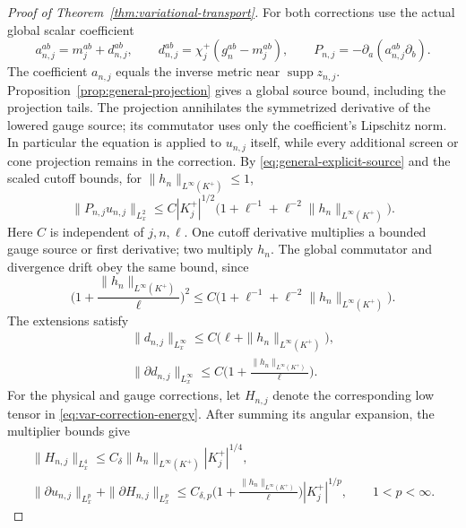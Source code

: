 \documentclass[11pt,a4paper]{article}
\numberwithin{equation}{section}
\newcommand{\supp}{\operatorname{supp}}
\newcommand{\f}[2]{\frac{#1}{#2}}
\theoremstyle{definition}
\begin{document}
\begin{proof}[Proof of Theorem~\ref{thm:variational-transport}]
For both corrections use the actual global scalar coefficient
\begin{equation*}
a_{n,j}^{ab}=m_j^{ab}+d_{n,j}^{ab},\qquad
d_{n,j}^{ab}=\chi_j^+(g_n^{ab}-m_j^{ab}),\qquad
P_{n,j}=-\partial_a(a_{n,j}^{ab}\partial_b).
\end{equation*}
The coefficient $a_{n,j}$ equals the inverse metric near
$\supp z_{n,j}$. Proposition~\ref{prop:general-projection} gives a global
source bound, including the projection tails.
The projection annihilates the symmetrized derivative of the lowered
gauge source; its commutator uses only the coefficient's Lipschitz norm.
In particular the equation is applied to $u_{n,j}$ itself, while every
additional screen or cone projection remains in the correction.
By \eqref{eq:general-explicit-source} and the scaled cutoff bounds,
for $\|h_n\|_{L^\infty(K^+)}\leq1$,
\begin{equation*}
\|P_{n,j}u_{n,j}\|_{L^2_x}
\leq C|K_j^+|^{1/2}
 \bigl(1+\ell^{-1}+\ell^{-2}\|h_n\|_{L^\infty(K^+)}\bigr).
\end{equation*}
Here $C$ is independent of $j,n,\ell$. One cutoff derivative multiplies
a bounded gauge source or first derivative; two multiply $h_n$.
The global commutator and divergence drift obey the same bound, since
\begin{equation*}
\bigg(1+\f{\|h_n\|_{L^\infty(K^+)}}{\ell}\bigg)^2
\leq C\bigl(1+\ell^{-1}+\ell^{-2}\|h_n\|_{L^\infty(K^+)}\bigr).
\end{equation*}
The extensions satisfy
\begin{equation*}
\begin{gathered}
\|d_{n,j}\|_{L^\infty_x}
 \leq C\bigl(\ell+\|h_n\|_{L^\infty(K^+)}\bigr),\\
\|\partial d_{n,j}\|_{L^\infty_x}
 \leq C\bigg(1+\f{\|h_n\|_{L^\infty(K^+)}}\ell\bigg).
\end{gathered}
\end{equation*}
For the physical and gauge corrections, let $H_{n,j}$ denote the
corresponding low tensor in \eqref{eq:var-correction-energy}.
After summing its angular expansion, the multiplier bounds give
\begin{equation*}
\begin{gathered}
\|H_{n,j}\|_{L^4_x}
 \leq C_\delta\|h_n\|_{L^\infty(K^+)}|K_j^+|^{1/4},\\
\|\partial u_{n,j}\|_{L^p_x}+\|\partial H_{n,j}\|_{L^p_x}
 \leq C_{\delta,p}
 \bigg(1+\f{\|h_n\|_{L^\infty(K^+)}}\ell\bigg)|K_j^+|^{1/p},
 \qquad 1<p<\infty.
\end{gathered}

\end{equation*}
\end{proof}
\end{document}
